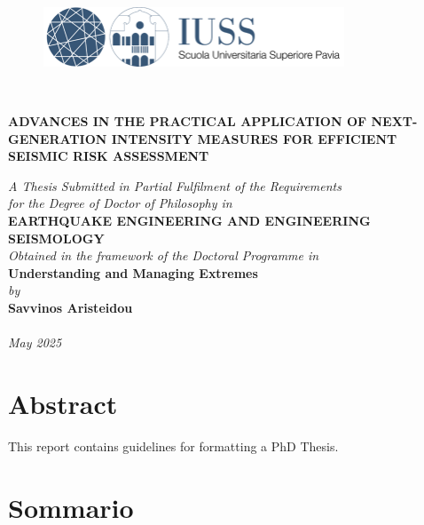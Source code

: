 \documentclass[12pt,a4paper,twoside, openright]{report}
\let\oldchapter\chapter
\renewcommand{\chapter}[1]{
	\oldchapter{#1}
	\thispagestyle{empty}
}
\begin{document}
	
	\begin{titlepage}
		\centering
		\begin{figure}[h!]
			\centering
			\includegraphics[width=0.8\textwidth]{figures/IUSS_logo.png}
		\end{figure}
		\\
		\vspace*{2cm}
		{\Large\bfseries ADVANCES IN THE PRACTICAL APPLICATION OF NEXT-GENERATION INTENSITY MEASURES FOR EFFICIENT SEISMIC RISK ASSESSMENT\par}
		\vspace{1cm}
		\textit{A Thesis Submitted in Partial Fulfilment of the Requirements\\
			for the Degree of Doctor of Philosophy in}\\[1cm]
		\textbf{EARTHQUAKE ENGINEERING AND ENGINEERING SEISMOLOGY}\\
		\vspace{1cm}
		\textit{Obtained in the framework of the Doctoral Programme in}\\[0.8cm]
		\textbf{Understanding and Managing Extremes}\\[1cm]
		\textit{by}\\[0.3cm]
		\textbf{Savvinos Aristeidou}\\[0.3cm]
		\\
		\vfill
		\textit{May 2025}
	\end{titlepage}
	
	\pagestyle{fancy}
	\fancyhf{}
	\fancyhead[RO]{\small\thepage} %
	\fancyhead[LE]{\small\thepage} %
	
	\oldchapter*{Abstract}
	
	This report contains guidelines for formatting a PhD Thesis.
	
	\newpage
	
	\oldchapter*{Sommario}
	
\end{document}
